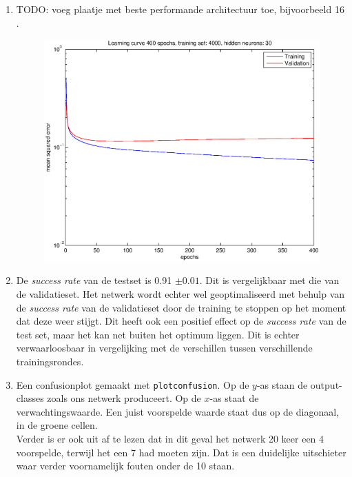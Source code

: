 \documentclass[a4paper,10pt,fleqn]{article}
\begin{document}
\begin{enumerate}[1.]
	\item TODO: voeg plaatje met beste performande architectuur toe, bijvoorbeeld 16 .
	\begin{figure}[!ht]
    	\centering
        \includegraphics[width=.7\textwidth]{images/learning_curve}
    \end{figure}
	\item De \textit{success rate} van de testset is 0.91 $\pm 0.01$. Dit is vergelijkbaar met die van de validatieset. Het netwerk wordt echter wel geoptimaliseerd met behulp van de \textit{success rate} van de validatieset door de training te stoppen op het moment dat deze weer stijgt. Dit heeft ook een positief effect op de \textit{success rate} van de test set, maar het kan net buiten het optimum liggen. Dit is echter verwaarloosbaar in vergelijking met de verschillen tussen verschillende trainingsrondes.

	\item Een confusionplot gemaakt met \verb|plotconfusion|. Op de $y$-as staan de output-classes zoals ons netwerk produceert. Op de $x$-as staat de verwachtingswaarde. Een juist voorspelde waarde staat dus op de diagonaal, in de groene cellen.  \\
    Verder is er ook uit af te lezen dat in dit geval het netwerk 20 keer een 4 voorspelde, terwijl het een 7 had moeten zijn. Dat is een duidelijke uitschieter waar verder voornamelijk fouten onder de 10 staan.


\end{enumerate}
\end{document}
